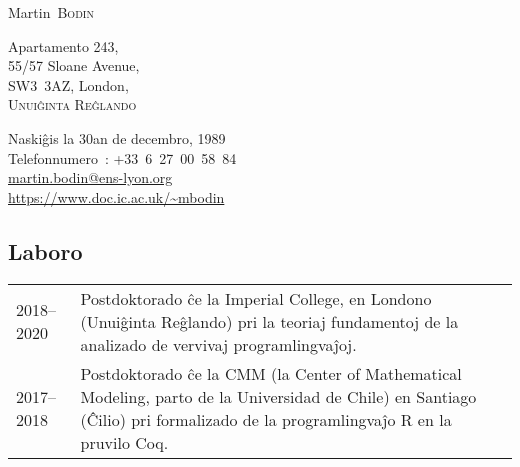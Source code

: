 \documentclass[12pt,a4paper]{article}
\makeatletter
\newcommand{\en}[1]{\foreignlanguage{english}{{#1}}}
\newcommand{\es}[1]{\foreignlanguage{spanish}{{#1}}}
\newcommand{\en}[1]{\foreignlanguage{english}{{#1}}}
\newcommand{\es}[1]{\foreignlanguage{spanish}{{#1}}}
\newenvironment{datecvsection}[1]%
               {\subsection*{#1}%
                 \noindent \begin{tabular}{@{}p{\annee}p{\texte}@{}}}
               {\end{tabular}}
\newcommand\familyName{\textsc}
\newcommand\placeName{}
\makeatother
\begin{document}
\pagestyle{empty}


\newlength{\annee}
\settowidth{\annee}{9999--9999}


\newlength{\texte}
\setlength{\texte}{\textwidth} \addtolength{\texte}{-\annee} 
	\addtolength{\texte}{-2\tabcolsep}

\begin{center} \Huge Martin~\familyName{Bodin} \end{center}

\parbox[c]{.5\textwidth}
{
  \noindent
  Apartamento 243, \\
  55/57 Sloane Avenue, \\
  SW3~3AZ, London, \\
  \textsc{Unuiĝinta Reĝlando}
}
\parbox[c]{.55\textwidth}
{
\begin{flushright}
  Naskiĝis la 30an de decembro, 1989 \\
  \noindent Telefonnumero~: \mbox{+33 6 27 00 58 84} \\
  \url{martin.bodin@ens-lyon.org} \\
  \url{https://www.doc.ic.ac.uk/~mbodin}
\end{flushright}
}


\begin{datecvsection}{Laboro}

    2018–2020 & Postdoktorado ĉe la \en{\placeName{Imperial College}}, en \placeName{Londono} (\placeName{Unuiĝinta Reĝlando}) pri la teoriaj fundamentoj de la analizado de vervivaj programlingvaĵoj. \\

    2017–2018 & Postdoktorado ĉe la \placeName{CMM} (la \en{\placeName{Center of Mathematical Modeling}}, parto de la \es{\placeName{Universidad de Chile}}) en \placeName{Santiago} (\placeName{Ĉilio}) pri formalizado de la programlingvaĵo R en la pruvilo Coq. \\

\end{datecvsection}
\end{document}
